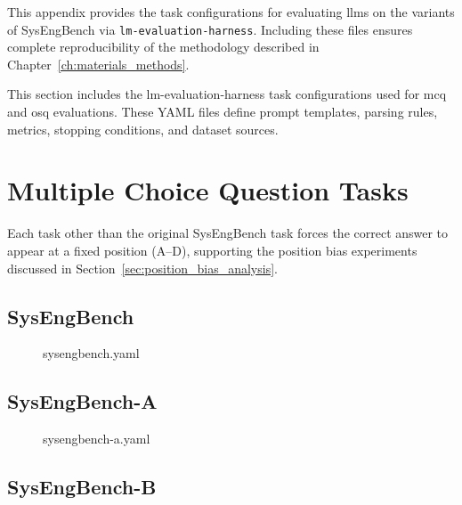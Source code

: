 \label{appendix-b}
This appendix provides the task configurations for evaluating \acp{llm} on the variants of SysEngBench via \texttt{lm-evaluation-harness}. Including these files ensures complete reproducibility of the methodology described in Chapter~\ref{ch:materials_methods}. 

This section includes the lm-evaluation-harness task configurations used
for \ac{mcq} and \ac{osq} evaluations. These YAML files define 
prompt templates, parsing rules, metrics, stopping conditions, and dataset 
sources.


\section{Multiple Choice Question Tasks}
\label{app:tasks_mcq}

Each task other than the original SysEngBench task forces the correct answer to appear at a fixed position (A–D), supporting the position bias experiments discussed in 
Section~\ref{sec:position_bias_analysis}.

\clearpage
\subsection{SysEngBench}
\begin{figure}[htbp]
\centering
\begin{scriptsize}

\end{scriptsize}
\caption{sysengbench.yaml}
\label{lst:sysengbench}
\end{figure}

\clearpage
\subsection{SysEngBench-A}

\begin{figure}[htbp]
\centering
\begin{scriptsize}

\end{scriptsize}
\caption{sysengbench-a.yaml}
\label{lst:sysengbench-a}
\end{figure}

\clearpage
\subsection{SysEngBench-B}

